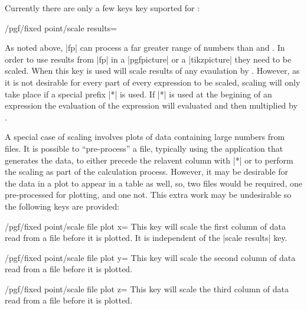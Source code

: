   Currently there are only a few keys key suported for :
  
\begin{key}{/pgf/fixed point/scale results=}

	As noted above, |fp| can process a far greater range of numbers
	than \pgfname{} and \tikzname{}. In order to use results from 
	|fp| in a |{pgfpicture}| or a |{tikzpicture}| they need to be
	scaled. When this key is used \pgfname{} will scale results
	of any evaulation by . However, as it is not
	desirable for every part of every expression to be scaled,
	scaling will only take place if a special prefix |*| is used.
	If |*| is used at the begining of an expression the evaluation
	of the expression will evaluated and then multiplied by 
	.

\begin{codeexample}[]	
\end{codeexample}
  
  A special case of scaling involves plots of data containing
  large numbers from files.
  It is possible to ``pre-process'' a file, typically using the 
  application that generates the data, to either precede
  the relavent column with |*| or to perform the scaling as part
  of the calculation process. However, it may be desirable for
  the data in a plot to appear in a table as well, so, two files would
  be required, one pre-processed for plotting, and one not. This
  extra work may be undesirable so the following keys are provided:
  
\begin{key}{/pgf/fixed point/scale file plot x=}
  This key will scale the first column of data read from
  a file before it is plotted. It is independent of the
  |scale results| key.
\end{key}

\begin{key}{/pgf/fixed point/scale file plot y=}
  This key will scale the second column of data read from
  a file before it is plotted. 
\end{key}

\begin{key}{/pgf/fixed point/scale file plot z=}
  This key will scale the third column of data read from
  a file before it is plotted. 
\end{key}

\end{key} 

